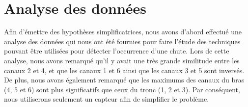 \documentclass[12pt,letterpaper]{article}
\begin{document}
\section{Analyse des données} %
Afin d'émettre des hypothèses simplificatrices, nous avons d'abord effectué une analyse des données qui nous ont été fournies pour faire l'étude des techniques pouvant être utilisées pour détecter l'occurrence d'une chute. Lors de cette analyse, nous avons remarqué qu'il y avait une très grande similitude entre les canaux 2 et 4, et que les canaux 1 et 6 ainsi que les canaux 3 et 5 sont inversés. De plus, nous avons également remarqué que les maximums des canaux du bras (4, 5 et 6) sont plus significatifs que ceux du tronc (1, 2 et 3). Par conséquent, nous utiliserons seulement un capteur afin de simplifier le problème.
\end{document}
